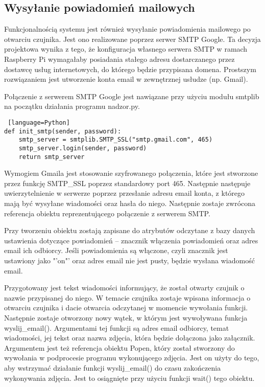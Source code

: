 \documentclass[a4paper,12pt,twoside]{article}
\begin{document}
\subsection{Wysyłanie powiadomień mailowych}
Funkcjonalnością systemu jest również wysyłanie powiadomienia mailowego po otwarciu czujnika. Jest ono realizowane poprzez serwer SMTP Google. Ta decyzja projektowa wynika z tego, że konfiguracja własnego serwera SMTP w ramach Raspberry Pi wymagałaby posiadania stałego adresu dostarczanego przez dostawcę usług internetowych, do którego będzie przypisana domena. Prostszym rozwiązaniem jest utworzenie konta email w zewnętrznej usłudze (np. Gmail). 

Połączenie z serwerem SMTP Google jest nawiązane przy użyciu modułu smtplib na początku działania programu nadzor.py. 
\begin{lstlisting} [language=Python]
def init_smtp(sender, password):
    smtp_server = smtplib.SMTP_SSL("smtp.gmail.com", 465)
    smtp_server.login(sender, password)
    return smtp_server 
\end{lstlisting}
Wymogiem Gmaila jest stosowanie szyfrowanego połączenia, które jest stworzone przez funkcję SMTP{\_}SSL poprzez standardowy port 465. Następnie następuje uwierzytelnienie w serwerze poprzez przesłanie adresu email konta, z którego mają być wysyłane wiadomości oraz hasła do niego. Następnie zostaje zwrócona referencja obiektu reprezentującego połączenie z serwerem SMTP.

Przy tworzeniu obiektu zostają zapisane do atrybutów odczytane z bazy danych ustawienia dotyczące powiadomień -- znacznik włączenia powiadomień oraz adres email ich odbiorcy. Jeśli powiadomienia są włączone, czyli znacznik jest ustawiony jako "'on"' oraz adres email nie jest pusty, będzie wysłana wiadomość email.

Przygotowany jest tekst wiadomości informujący, że został otwarty czujnik o nazwie przypisanej do niego. W temacie czujnika zostaje wpisana informacja o otwarciu czujnika i dacie otwarcia odczytanej w momencie wywołania funkcji. Następnie zostaje otworzony nowy wątek, w którym jest wywoływana funkcja wyslij{\_}email(). Argumentami tej funkcji są adres email odbiorcy, temat wiadomości, jej tekst oraz nazwa zdjęcia, która będzie dołączona jako załącznik. Argumentem jest też referencja obiektu Popen, który został stworzony do wywołania w podprocesie programu wykonującego zdjęcia. Jest on użyty do tego, aby wstrzymać działanie funkcji wyslij{\_}email() do czasu zakończenia wykonywania zdjęcia. Jest to osiągnięte przy użyciu funkcji wait() tego obiektu.
\end{document}
